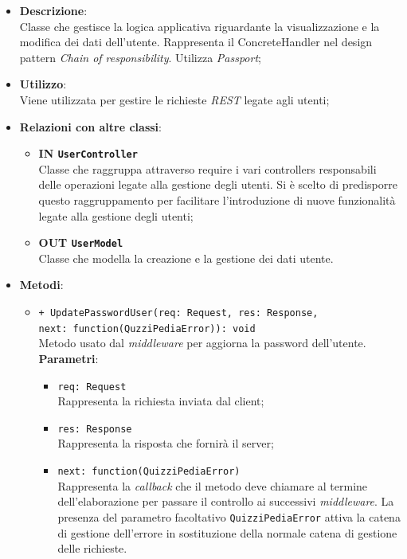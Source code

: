 \begin{itemize}
	\item 
	\textbf{Descrizione}:\\
	Classe che gestisce la logica applicativa riguardante la visualizzazione e la modifica dei dati dell'utente.
Rappresenta il ConcreteHandler nel design pattern \textit{Chain of responsibility}. Utilizza \textit{Passport};
	\item
	\textbf{Utilizzo}:\\
	Viene utilizzata per gestire le richieste \textit{REST} legate agli utenti;
	\item
	\textbf{Relazioni con altre classi}:
	\begin{itemize}
		\item
		\textbf{IN \texttt{UserController}} \\
		Classe che raggruppa attraverso require i vari controllers responsabili delle operazioni legate alla gestione degli utenti. Si è scelto di predisporre questo raggruppamento per facilitare l'introduzione di nuove funzionalità legate alla gestione degli utenti;
		\item
		\textbf{OUT \texttt{UserModel}} \\
		Classe che modella la creazione e la gestione dei dati utente.
	\end{itemize}
	\item
	\textbf{Metodi}:
	\begin{itemize}
		\item
		\texttt{+ UpdatePasswordUser(req: Request, res: Response, \\next: function(QuzziPediaError)): void} \\
		Metodo usato dal \textit{middleware} per aggiorna la password dell'utente. \\
		\textbf{Parametri}:
		 \begin{itemize}
		  \item
			\texttt{req: Request} \\
			Rappresenta la richiesta inviata dal client;
		  \item
			\texttt{res: Response} \\
			Rappresenta la risposta che fornirà il server;
		  \item
		    \texttt{next: function(QuizziPediaError)} \\
			Rappresenta la \textit{callback} che il metodo deve chiamare al termine dell'elaborazione per passare il controllo ai successivi \textit{middleware}. La presenza del parametro facoltativo \texttt{QuizziPediaError} attiva la catena di gestione dell'errore in sostituzione della normale catena di gestione delle richieste.

\end{itemize}
\end{itemize}
\end{itemize}
